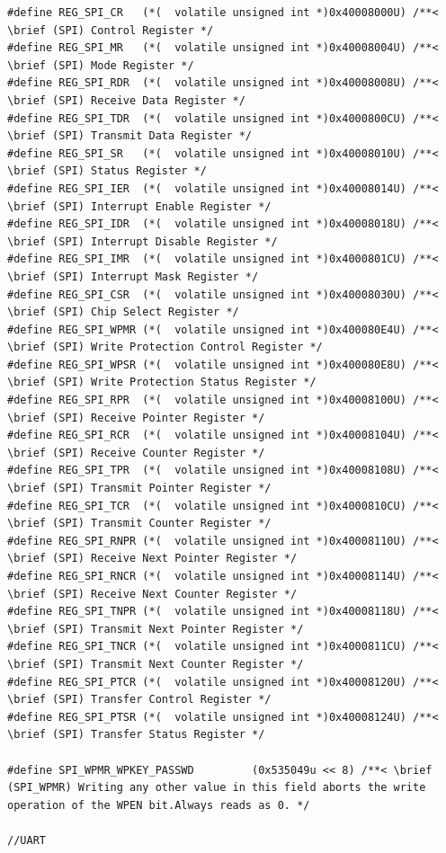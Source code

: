 \documentclass[12pt]{article}
\begin{document}
\begin{tiny}
\begin{verbatim}
#define REG_SPI_CR   (*(  volatile unsigned int *)0x40008000U) /**< \brief (SPI) Control Register */
#define REG_SPI_MR   (*(  volatile unsigned int *)0x40008004U) /**< \brief (SPI) Mode Register */
#define REG_SPI_RDR  (*(  volatile unsigned int *)0x40008008U) /**< \brief (SPI) Receive Data Register */
#define REG_SPI_TDR  (*(  volatile unsigned int *)0x4000800CU) /**< \brief (SPI) Transmit Data Register */
#define REG_SPI_SR   (*(  volatile unsigned int *)0x40008010U) /**< \brief (SPI) Status Register */
#define REG_SPI_IER  (*(  volatile unsigned int *)0x40008014U) /**< \brief (SPI) Interrupt Enable Register */
#define REG_SPI_IDR  (*(  volatile unsigned int *)0x40008018U) /**< \brief (SPI) Interrupt Disable Register */
#define REG_SPI_IMR  (*(  volatile unsigned int *)0x4000801CU) /**< \brief (SPI) Interrupt Mask Register */
#define REG_SPI_CSR  (*(  volatile unsigned int *)0x40008030U) /**< \brief (SPI) Chip Select Register */
#define REG_SPI_WPMR (*(  volatile unsigned int *)0x400080E4U) /**< \brief (SPI) Write Protection Control Register */
#define REG_SPI_WPSR (*(  volatile unsigned int *)0x400080E8U) /**< \brief (SPI) Write Protection Status Register */
#define REG_SPI_RPR  (*(  volatile unsigned int *)0x40008100U) /**< \brief (SPI) Receive Pointer Register */
#define REG_SPI_RCR  (*(  volatile unsigned int *)0x40008104U) /**< \brief (SPI) Receive Counter Register */
#define REG_SPI_TPR  (*(  volatile unsigned int *)0x40008108U) /**< \brief (SPI) Transmit Pointer Register */
#define REG_SPI_TCR  (*(  volatile unsigned int *)0x4000810CU) /**< \brief (SPI) Transmit Counter Register */
#define REG_SPI_RNPR (*(  volatile unsigned int *)0x40008110U) /**< \brief (SPI) Receive Next Pointer Register */
#define REG_SPI_RNCR (*(  volatile unsigned int *)0x40008114U) /**< \brief (SPI) Receive Next Counter Register */
#define REG_SPI_TNPR (*(  volatile unsigned int *)0x40008118U) /**< \brief (SPI) Transmit Next Pointer Register */
#define REG_SPI_TNCR (*(  volatile unsigned int *)0x4000811CU) /**< \brief (SPI) Transmit Next Counter Register */
#define REG_SPI_PTCR (*(  volatile unsigned int *)0x40008120U) /**< \brief (SPI) Transfer Control Register */
#define REG_SPI_PTSR (*(  volatile unsigned int *)0x40008124U) /**< \brief (SPI) Transfer Status Register */

#define SPI_WPMR_WPKEY_PASSWD         (0x535049u << 8) /**< \brief (SPI_WPMR) Writing any other value in this field aborts the write
operation of the WPEN bit.Always reads as 0. */

//UART


\end{verbatim}
\end{tiny}
\end{document}
